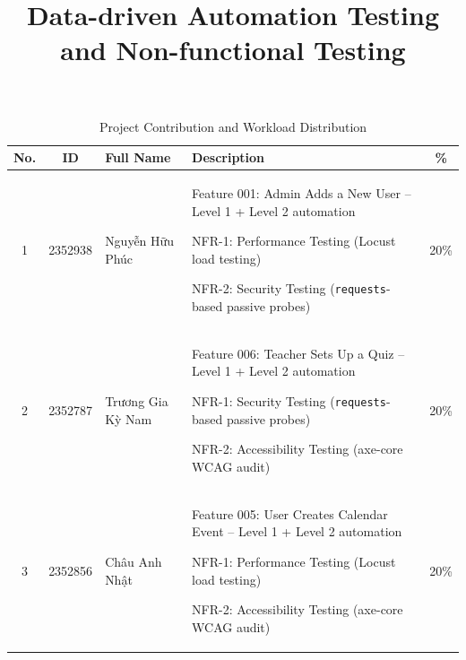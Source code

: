 \documentclass[twoside,final]{hcmut-report}
\title{Data-driven Automation Testing and Non-functional Testing}
\begin{document}
\coverpage%

\tableofcontents
\pagebreak

\begin{table}[ht]
    \centering
    \caption{Project Contribution and Workload Distribution}
    \vspace{0.2cm}
    \small
    \renewcommand{\arraystretch}{1.4}

    \begin{tabularx}{\textwidth}{|c|c|p{2.5cm}|>{\raggedright\arraybackslash}X|c|}
    \hline
    \textbf{No.} & \textbf{ID} & \textbf{Full Name} & \textbf{Description} & \textbf{\%} \\ \hline

    1 & 2352938 & Nguyễn Hữu Phúc &
    \begin{filelist}
        \item Feature 001: Admin Adds a New User -- Level 1 + Level 2 automation
        \item NFR-1: Performance Testing (Locust load testing)
        \item NFR-2: Security Testing (\texttt{requests}-based passive probes)
    \end{filelist} & 20\% \\ \hline

    2 & 2352787 & Trương Gia Kỳ Nam &
    \begin{filelist}
       \item Feature 006: Teacher Sets Up a Quiz -- Level 1 + Level 2 automation
       \item NFR-1: Security Testing (\texttt{requests}-based passive probes)
       \item NFR-2: Accessibility Testing (axe-core WCAG audit)
    \end{filelist} & 20\% \\ \hline

    3 & 2352856 & Châu Anh Nhật &
    \begin{filelist}
        \item Feature 005: User Creates Calendar Event -- Level 1 + Level 2 automation
        \item NFR-1: Performance Testing (Locust load testing)
        \item NFR-2: Accessibility Testing (axe-core WCAG audit)
    \end{filelist} & 20\% \\ \hline


\end{tabularx}
\end{table}
\end{document}
